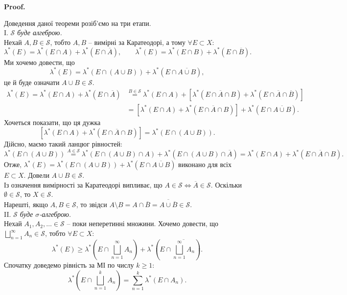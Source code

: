 \documentclass[a4paper, 10pt]{article}
\makeatletter
\theoremstyle{theoremdd}
\renewenvironment{proof}[1][Proof.\\]{\par
\pushQED{\hfill \qed}%
\normalfont \topsep6\p@\@plus6\p@\relax
\trivlist
\item\relax
{\bfseries
#1\@addpunct{.}}\hspace\labelsep\ignorespaces
}{%
\popQED\endtrivlist\@endpefalse
}
\makeatother
\begin{document}
\begin{proof}
Доведення даної теореми розіб'ємо на три етапи.\\
I. \textit{$\mathcal{S}$ буде алгеброю.}\\
Нехай $A,B \in \mathcal{S}$, тобто $A,B$ -- вимірні за Каратеодорі, а тому $\forall E \subset X$:
\[
\lambda^*(E) = \lambda^*(E \cap A) + \lambda^*(E \cap \overline{A}), \qquad \lambda^*(E) = \lambda^*(E \cap B) + \lambda^*(E \cap \overline{B}).
\]
Ми хочемо довести, що 
\[
\lambda^*(E) = \lambda^*(E \cap (A \cup B)) + \lambda^*(E \cap \overline{A \cup B}),
\] це й буде означати $A \cup B \in \mathcal{S}$.
\begin{align*}
\lambda^*(E) = \lambda^*(E \cap A) + \lambda^*(E \cap \overline{A}) & \overset{B \in \mathcal{S}}{=} \lambda^*(E \cap A) + [\lambda^*(E \cap \overline{A} \cap B) + \lambda^*(E \cap \overline{A} \cap \overline{B})] \\
& = [\lambda^*(E \cap A) + \lambda^*(E \cap \overline{A} \cap B)] + \lambda^*(E \cap \overline{A \cup B}).
\end{align*}
Хочеться показати, що ця дужка \[
[\lambda^*(E \cap A) + \lambda^*(E \cap \overline{A} \cap B)] = \lambda^*(E \cap (A \cup B)).
\] 
Дійсно, маємо такий ланцюг рівностей:
\[
\lambda^*(E \cap (A \cup B)) \overset{A \in \mathcal{S}}{=} \lambda^*(E \cap (A \cup B) \cap A) + \lambda^*(E \cap (A \cup B) \cap \overline{A}) = \lambda^*(E \cap A) + \lambda^*(E \cap \overline{A} \cap B).
\]
Отже, $\lambda^*(E) = \lambda^*(E \cap (A \cup B)) + \lambda^*(E \cap \overline{A \cup B})$ виконано для всіх $E \subset X$. Довели $A \cup B \in \mathcal{S}$.\\
Із означення вимірності за Каратеодорі випливає, що $A \in \mathcal{S} \iff \overline{A} \in \mathcal{S}$. Оскільки $\emptyset \in \mathcal{S}$, то $X \in \mathcal{S}$.\\
Нарешті, якщо $A,B \in \mathcal{S}$, то звідси $A \setminus B = A \cap \overline{B} = \overline{A \cup \overline{B}} \in \mathcal{S}$.
\bigskip \\
II. \textit{$\mathcal{S}$ буде $\sigma$-алгеброю.}\\
Нехай $A_1,A_2,\dots \in \mathcal{S}$ -- поки неперетинні множини. Хочемо довести, що $\displaystyle\bigsqcup_{n=1}^\infty A_n \in \mathcal{S}$, тобто $\forall E \subset X$:
\[
\displaystyle\lambda^*(E) \geq \lambda^*\left( E \cap \bigsqcup_{n=1}^\infty A_n \right) + \lambda^*\left( E \cap \overline{\bigsqcup_{n=1}^\infty A_n} \right).
\]
Спочатку доведемо рівність за МІ по числу $k \geq 1$: 
\[
\displaystyle\lambda^*\left( E \cap \bigsqcup_{n=1}^k A_n \right) = \sum_{n=1}^k \lambda^*(E \cap A_n).
\]
\end{proof}
\end{document}
